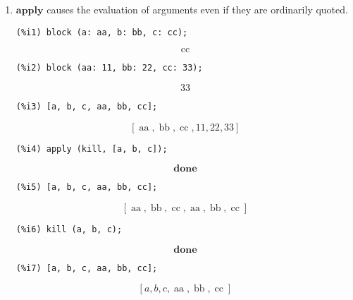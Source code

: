 \documentclass[12pt,leqno]{article}
\begin{document}
\begin{enumerate}
\item $\mathbf{apply}$ causes the evaluation of arguments even if they are ordinarily quoted.
\begin{verbatim}
(%i1) block (a: aa, b: bb, c: cc);
\end{verbatim}
\begin{dmath}[number={\(\mathop{\mathrm{\%o}_{1}}\)}]
\mathop{\mathrm{cc}}
\end{dmath}
\begin{verbatim}
(%i2) block (aa: 11, bb: 22, cc: 33);
\end{verbatim}
\begin{dmath}[number={\(\mathop{\mathrm{\%o}_{2}}\)}]
33
\end{dmath}
\begin{verbatim}
(%i3) [a, b, c, aa, bb, cc];
\end{verbatim}
\begin{dmath}[number={\(\mathop{\mathrm{\%o}_{3}}\)}]
\left[\mathop{\mathrm{aa}}, \mathop{\mathrm{bb}}, \mathop{\mathrm{cc}}, 11, 22, 33\right]
\end{dmath}
\begin{verbatim}
(%i4) apply (kill, [a, b, c]);
\end{verbatim}
\begin{dmath}[number={\(\mathop{\mathrm{\%o}_{4}}\)}]
\mathop{\mathbf{done}}
\end{dmath}
\begin{verbatim}
(%i5) [a, b, c, aa, bb, cc];
\end{verbatim}
\begin{dmath}[number={\(\mathop{\mathrm{\%o}_{5}}\)}]
\left[\mathop{\mathrm{aa}}, \mathop{\mathrm{bb}}, \mathop{\mathrm{cc}}, \mathop{\mathrm{aa}}, \mathop{\mathrm{bb}}, \mathop{\mathrm{cc}}\right]
\end{dmath}
\begin{verbatim}
(%i6) kill (a, b, c);
\end{verbatim}
\begin{dmath}[number={\(\mathop{\mathrm{\%o}_{6}}\)}]
\mathop{\mathbf{done}}
\end{dmath}
\begin{verbatim}
(%i7) [a, b, c, aa, bb, cc];
\end{verbatim}
\begin{dmath}[number={\(\mathop{\mathrm{\%o}_{7}}\)}]
\left[a, b, c, \mathop{\mathrm{aa}}, \mathop{\mathrm{bb}}, \mathop{\mathrm{cc}}\right]
\end{dmath}



\end{enumerate}
\end{document}
